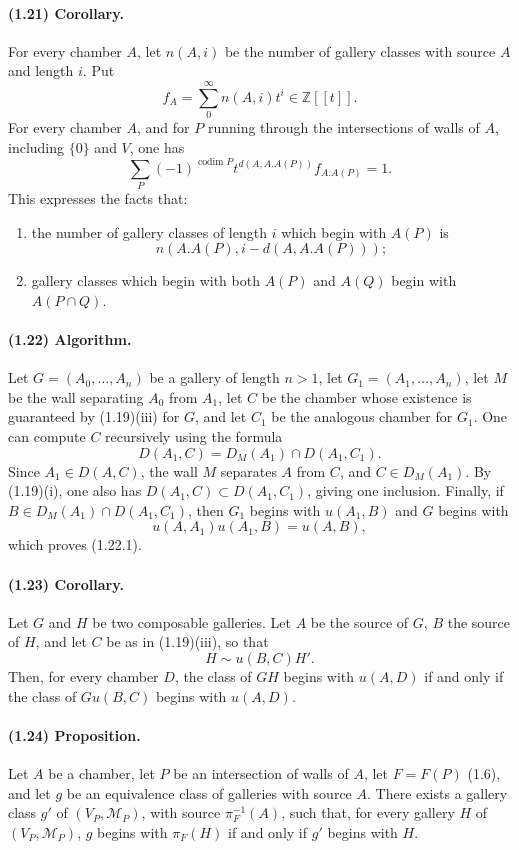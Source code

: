 \documentclass[10pt]{article}
\newcommand{\Z}{\mathbb Z}
\newcommand{\codim}{\operatorname{codim}}
\begin{document}
\paragraph{(1.21) Corollary.} For every chamber $A$, let $n(A,i)$ be the number of gallery classes with source $A$ and length $i$. Put
\[
f_A=\sum_{0}^{\infty}n(A,i)t^i\in\Z[[t]].
\]
For every chamber $A$, and for $P$ running through the intersections of walls of $A$, including $\{0\}$ and $V$, one has
\[
\sum_P (-1)^{\codim P}t^{d(A,A.A(P))}f_{A.A(P)}=1.
\]
This expresses the facts that:
\begin{enumerate}[label=\alph*)]
\item the number of gallery classes of length $i$ which begin with $A(P)$ is
\[
n(A.A(P),i-d(A,A.A(P)));
\]
\item gallery classes which begin with both $A(P)$ and $A(Q)$ begin with $A(P\cap Q)$.
\end{enumerate}

\paragraph{(1.22) Algorithm.} Let $G=(A_0,\ldots,A_n)$ be a gallery of length $n>1$, let $G_1=(A_1,\ldots,A_n)$, let $M$ be the wall separating $A_0$ from $A_1$, let $C$ be the chamber whose existence is guaranteed by (1.19)(iii) for $G$, and let $C_1$ be the analogous chamber for $G_1$. One can compute $C$ recursively using the formula
\[
\tag{1.22.1}
D(A_1,C)=D_M(A_1)\cap D(A_1,C_1).
\]
Since $A_1\in D(A,C)$, the wall $M$ separates $A$ from $C$, and $C\in D_M(A_1)$. By (1.19)(i), one also has $D(A_1,C)\subset D(A_1,C_1)$, giving one inclusion. Finally, if $B\in D_M(A_1)\cap D(A_1,C_1)$, then $G_1$ begins with $u(A_1,B)$ and $G$ begins with
\[
u(A,A_1)u(A_1,B)=u(A,B),
\]
which proves (1.22.1).

\paragraph{(1.23) Corollary.} Let $G$ and $H$ be two composable galleries. Let $A$ be the source of $G$, $B$ the source of $H$, and let $C$ be as in (1.19)(iii), so that
\[
H\sim u(B,C)H'.
\]
Then, for every chamber $D$, the class of $GH$ begins with $u(A,D)$ if and only if the class of $Gu(B,C)$ begins with $u(A,D)$.




\paragraph{(1.24) Proposition.} Let \(A\) be a chamber, let \(P\) be an intersection of walls of \(A\), let \(F=F(P)\) (1.6), and let \(g\) be an equivalence class of galleries with source \(A\). There exists a gallery class \(g'\) of \((V_P,\mathcal M_P)\), with source \(\pi_F^{-1}(A)\), such that, for every gallery \(H\) of \((V_P,\mathcal M_P)\), \(g\) begins with \(\pi_F(H)\) if and only if \(g'\) begins with \(H\).
\end{document}
